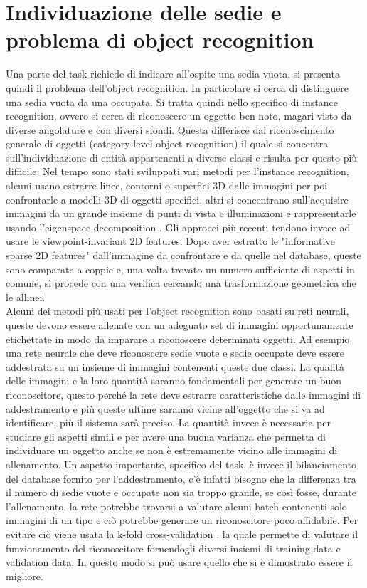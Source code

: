 \documentclass[italian, twoside]{sapthesis} %
\begin{document}
\section{Individuazione delle sedie e problema di object recognition}
Una parte del task richiede di indicare all'ospite una sedia vuota, si presenta quindi il problema dell’object recognition. In particolare si cerca di distinguere una sedia vuota da una occupata. Si tratta quindi nello specifico di instance recognition, ovvero si cerca di riconoscere un oggetto ben noto, magari visto da diverse angolature e con diversi sfondi. Questa differisce dal riconoscimento generale di oggetti (category-level object recognition) il quale si concentra sull’individuazione di entità appartenenti a diverse classi e risulta per questo più difficile. Nel tempo sono stati sviluppati vari metodi per l’instance recognition, alcuni usano estrarre linee, contorni o superfici 3D dalle immagini per poi confrontarle a modelli 3D di oggetti specifici, altri si concentrano sull’acquisire immagini da un grande insieme di punti di vista e illuminazioni e rappresentarle usando l’eigenspace decomposition \cite{murase1993learning}. Gli approcci più recenti tendono invece ad usare le viewpoint-invariant 2D features. Dopo aver estratto le "informative sparse 2D features" dall’immagine da confrontare e da quelle nel database, queste sono comparate a coppie e, una volta trovato un numero sufficiente di aspetti in comune, si procede con una verifica cercando una trasformazione geometrica che le allinei.\\Alcuni dei metodi più usati per l’object recognition sono basati su reti neurali, queste devono essere allenate con un adeguato set di immagini opportunamente etichettate in modo da imparare a riconoscere determinati oggetti. Ad esempio una rete neurale che deve riconoscere sedie vuote e sedie occupate deve essere addestrata su un insieme di immagini contenenti queste due classi. La qualità delle immagini e la loro quantità saranno fondamentali per generare un buon riconoscitore, questo perché la rete deve estrarre caratteristiche dalle immagini di addestramento e più queste ultime saranno vicine all’oggetto che si va ad identificare, più il sistema sarà preciso. La quantità invece è necessaria per studiare gli aspetti simili e per avere una buona varianza che permetta di individuare un oggetto anche se non è estremamente vicino alle immagini di allenamento. Un aspetto importante, specifico del task, è invece il bilanciamento del database fornito per l’addestramento, c’è infatti bisogno che la differenza tra il numero di sedie vuote e occupate non sia troppo grande, se così fosse, durante l’allenamento, la rete potrebbe trovarsi a valutare alcuni batch contenenti solo immagini di un tipo e ciò potrebbe generare un riconoscitore poco affidabile. Per evitare ciò viene usata la k-fold cross-validation \cite{bengio2003no}, la quale permette di valutare il funzionamento del riconoscitore fornendogli diversi insiemi di training data e validation data. In questo modo si può usare quello che si è dimostrato essere il migliore.
\end{document}
